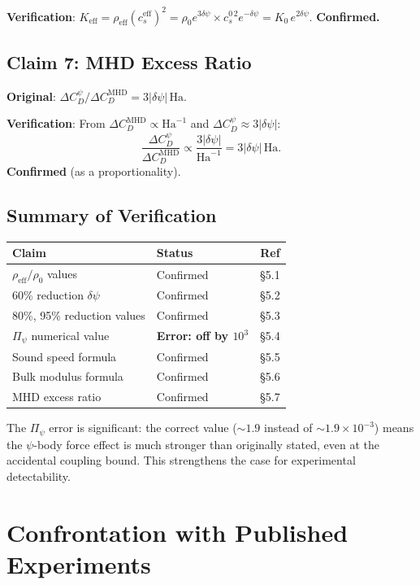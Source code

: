 \documentclass[12pt,twocolumn]{article}
\newcommand{\Reff}{\mathrm{eff}}
\newcommand{\Ha}{\mathrm{Ha}}
\newcommand{\dpsi}{\delta\psi}
\begin{document}
\textbf{Verification}: $K_\Reff = \rho_\Reff(c_s^\Reff)^2 =
\rho_0 e^{3\dpsi}\times c_s^{0\,2}e^{-\dpsi} = K_0\,e^{2\dpsi}$.
\textbf{Confirmed.}

\subsection{Claim 7: MHD Excess Ratio}

\textbf{Original}: $\Delta C_D^\psi/\Delta C_D^\mathrm{MHD} =
3|\dpsi|\,\Ha$.

\textbf{Verification}: From $\Delta C_D^\mathrm{MHD} \propto \Ha^{-1}$
and $\Delta C_D^\psi \approx 3|\dpsi|$:
\begin{equation}
\frac{\Delta C_D^\psi}{\Delta C_D^\mathrm{MHD}}
\propto \frac{3|\dpsi|}{\Ha^{-1}} = 3|\dpsi|\,\Ha.
\end{equation}
\textbf{Confirmed} (as a proportionality).

\subsection{Summary of Verification}

\begin{center}
\begin{tabular}{@{}llc@{}}
\toprule
\textbf{Claim} & \textbf{Status} & \textbf{Ref} \\
\midrule
$\rho_\Reff/\rho_0$ values & Confirmed & \S5.1 \\
60\% reduction $\dpsi$ & Confirmed & \S5.2 \\
80\%, 95\% reduction values & Confirmed & \S5.3 \\
$\Pi_\psi$ numerical value & \textbf{Error: off by $10^3$} & \S5.4 \\
Sound speed formula & Confirmed & \S5.5 \\
Bulk modulus formula & Confirmed & \S5.6 \\
MHD excess ratio & Confirmed & \S5.7 \\
\bottomrule
\end{tabular}
\end{center}

The $\Pi_\psi$ error is significant: the correct value ($\sim 1.9$
instead of $\sim 1.9\times10^{-3}$) means the $\psi$-body force effect
is much stronger than originally stated, even at the accidental coupling
bound. This strengthens the case for experimental detectability.

\section{Confrontation with Published Experiments}
\label{sec:experiments}
\end{document}
